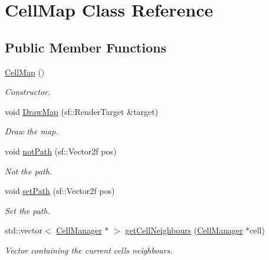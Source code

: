 \hypertarget{class_cell_map}{}\section{Cell\+Map Class Reference}
\label{class_cell_map}
\subsection*{Public Member Functions}
\begin{DoxyCompactItemize}
\item 
\mbox{\label{class_cell_map_af5e47ca959f63f4678a4346f773030f7}} 
\mbox{\hyperlink{class_cell_map_af5e47ca959f63f4678a4346f773030f7}{Cell\+Map}} ()
\begin{DoxyCompactList}\small\item\em Constructor. \end{DoxyCompactList}\item 
void \mbox{\hyperlink{class_cell_map_a64c4abb5efb6540e34e7bb73bdb12e76}{Draw\+Map}} (sf\+::\+Render\+Target \&target)
\begin{DoxyCompactList}\small\item\em Draw the map. \end{DoxyCompactList}\item 
void \mbox{\hyperlink{class_cell_map_a0532f2df278250c570914b4c3c8c6b5f}{not\+Path}} (sf\+::\+Vector2f pos)
\begin{DoxyCompactList}\small\item\em Not the path. \end{DoxyCompactList}\item 
void \mbox{\hyperlink{class_cell_map_a639a7552b9d5ac42f8d652db4852568d}{set\+Path}} (sf\+::\+Vector2f pos)
\begin{DoxyCompactList}\small\item\em Set the path. \end{DoxyCompactList}\item 
std\+::vector$<$ \mbox{\hyperlink{class_cell_manager}{Cell\+Manager}} $\ast$ $>$ \mbox{\hyperlink{class_cell_map_a3e63b51e165eb896c7e1900efff13245}{get\+Cell\+Neighbours}} (\mbox{\hyperlink{class_cell_manager}{Cell\+Manager}} $\ast$cell)
\begin{DoxyCompactList}\small\item\em Vector containing the current cells neighbours. \end{DoxyCompactList}\item 

\end{DoxyCompactItemize}
